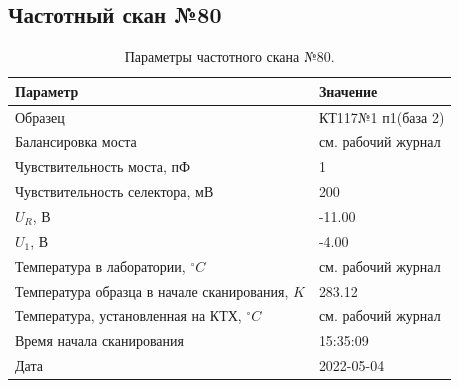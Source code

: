 \subsection{Частотный скан №80}
\begin{table}[!ht]
    \centering
    \caption{Параметры частотного скана №80.}
    \begin{tabular}{|l|l|}
        \hline
        Параметр                                       & Значение                  \\ \hline
        Образец                                        & КТ117№1 п1(база 2)        \\ \hline
        Балансировка моста                             & см. рабочий журнал        \\ \hline
        Чувствительность моста, пФ                     & 1                         \\ \hline
        Чувствительность селектора, мВ                 & 200                       \\ \hline
        $U_R$, В                                       & -11.00                    \\ \hline
        $U_1$, В                                       & -4.00                     \\ \hline
        Температура в лаборатории, $^\circ C$          & см. рабочий журнал        \\ \hline
        Температура образца в начале сканирования, $K$ & 283.12                    \\ \hline
        Температура, установленная на КТХ, $^\circ C$  & см. рабочий журнал        \\ \hline
        Время начала сканирования                      & 15:35:09                  \\ \hline
        Дата                                           & 2022-05-04                \\ \hline
    \end{tabular}
    \label{table:frequency_scan_80}
\end{table}

